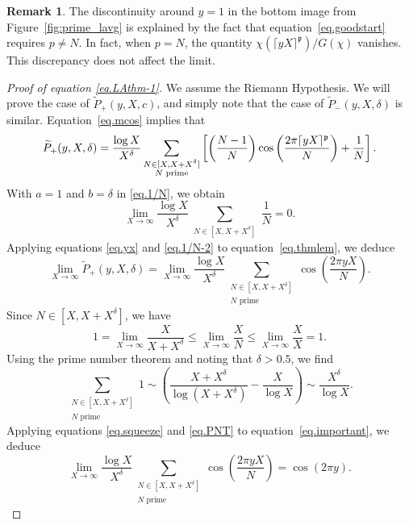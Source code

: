 \documentclass{amsart}
\theoremstyle{definition}
\newtheorem{remark}[theorem]{Remark}
\newcommand{\prceil}{\rceil^{\mathfrak p}}
\numberwithin{equation}{section}
\begin{document}
\begin{remark}\label{rem.discont}
The discontinuity around $y=1$ in the bottom image from Figure~\ref{fig:prime_lavg} is explained by the fact that equation~\eqref{eq.goodstart} requires $p\neq N$.
In fact, when $p=N$, the quantity $\chi(\lceil yX \prceil)/G(\chi)$ vanishes. 
This discrepancy does not affect the limit.
\end{remark}
\begin{proof}[Proof of equation \eqref{eq.LAthm-1}]
We assume the Riemann Hypothesis.
We will prove the case of $\widetilde P_+(y,X,c)$, and simply note that the case of $\widetilde P_- (y, X, \delta)$ is similar.
Equation~\eqref{eq.mcos} implies that
\begin{equation}\label{eq.thmlem}
 \widetilde P_+ (y, X, \delta)= \frac{\log X}{X^{\delta}} \sum_{\substack{N \in [X, X+X^{\delta}] \\ N \text{ prime}}} \left [ \left(\frac{N-1}{N} \right)\cos\left(\frac{2\pi \lceil y X \prceil}{N}\right) + \frac 1 N \right ].\\
\end{equation}
With $a=1$ and $b=\delta$ in \eqref{eq.1/N}, we obtain
\begin{equation} \label{eq.1/N-2}
    \lim_{X \to \infty} \frac{\log X}{X^\delta} \sum_{\substack{N \in [X, X+X^\delta]}} \frac{1}{N}  = 0.
\end{equation}
Applying equations \eqref{eq.yx} and \eqref{eq.1/N-2} to equation~\eqref{eq.thmlem}, we deduce
\begin{equation}\label{eq.important}
\lim_{X \to \infty} \widetilde P_+ (y, X, \delta) = \lim_{X \to \infty} \frac{\log X}{X^{\delta}} \sum_{\substack{N \in [X, X+X^{\delta}] \\ N \text{ prime}}}\cos\left(\frac{2\pi  y X }{N}\right).
\end{equation}
Since $N \in [X, X + X^\delta]$, we have
\begin{equation}\label{eq.squeeze}
1 = \lim_{X \to \infty} \frac{X}{X+X^\delta} \leq  \lim_{X \to \infty} \frac{X}{N} \leq \lim_{X \to \infty} \frac{X}{X} = 1.
\end{equation}
Using the prime number theorem and noting that $\delta > 0.5$, we find
\begin{equation}\label{eq.PNT}
\sum_{\substack{N \in [X, X+X^{\delta}] \\ N \text{ prime}}} 1 \sim \left (\frac{X + X^{\delta}}{\log\left(X + X^{\delta}\right)} - \frac{X}{\log X} \right ) \sim \frac{X^{\delta}}{\log X}.
\end{equation}
Applying equations \eqref{eq.squeeze} and \eqref{eq.PNT} to equation~\eqref{eq.important}, we deduce 
\begin{equation}\label{eq.almost}
\lim_{X \to \infty} \frac{\log X}{X^{\delta}} \sum_{\substack{N \in [X, X+X^{\delta}] \\ N \text{ prime}}}\cos\left(\frac{2\pi  y X }{N}\right) = \cos(2 \pi y).
\end{equation}
\end{proof}
\end{document}
